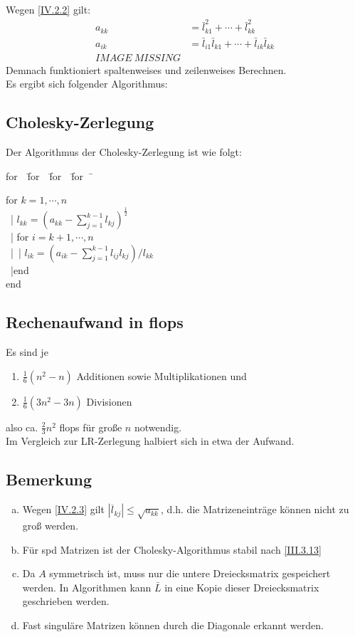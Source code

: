 \documentclass[ngerman,fontsize=11pt, paper=a4, parskip=half, titlepage=true, toc=bib]{scrbook}
\newenvironment{pseudocode}[1]{ %
		\begin{minipage}{#1}
			\begin{framed}
				\hspace*{1em}	
				\begin{minipage}{#1}
					\begin{tabbing}
						for~~\= for~~\= for~~\= for~~\= \kill
	}
	{ %
					\end{tabbing}
				\end{minipage}
				\hspace*{1em}
			\end{framed}
		\end{minipage}
	}
\begin{document}
		Wegen \eqref{IV.2.2} gilt: 
		\begin{align}
			a_{kk} &= \bar{l}_{k1}^{2} + \cdots +  \bar{l}_{kk}^2  \label{IV.2.3} \\
			a_{ik} &= \bar{l}_{i1} \bar{l}_{k1} + \cdots + \bar{l}_{ik} \bar{l}_{kk}  \label{IV.2.4} \\
			IMAGE~MISSING
		\end{align}
		Demnach funktioniert spaltenweises und zeilenweises Berechnen. \\
		
		Es ergibt sich folgender Algorithmus:
		
		
		\subsection{Cholesky-Zerlegung}
			Der Algorithmus der Cholesky-Zerlegung ist wie folgt:
			
				\begin{pseudocode}{0.55\linewidth}
						for  $k=1, \cdots , n$\\
									~|\> $l_{kk} = (a_{kk}-\sum_{j=1}^{k-1}l_{kj})^{\frac{1}{2}}$ \\
									~|\> for $i= k+1, \cdots , n$ \\
									~|\>~|\> $l_{ik} = ( a_{ik}- \sum_{j=1}^{k-1}l_{ij} l_{kj})/{l_{kk}}$  \\
									~|\>end\\
						end
					\end{pseudocode}
			
			
			
	\subsection{Rechenaufwand in flops}
	Es sind je 
		\begin{enumerate}
			\item[] $\frac{1}{6}(n^2-n) $ Additionen sowie Multiplikationen und 
			\item[]  $\frac{1}{6}(3n^2-3n) $ Divisionen 
		\end{enumerate}
		also ca. $\frac{2}{3} n^2$ flops für große $n$ notwendig. \\
		Im Vergleich zur LR-Zerlegung halbiert sich in etwa der Aufwand.
		
		\subsection{Bemerkung}
		\begin{enumerate}[a)]
			\item Wegen \eqref{IV.2.3} gilt $|\overline{l}_{kj}| \leq \sqrt{a_{kk}}$,
						d.h. die Matrizeneinträge können nicht zu groß werden.
			\item Für spd Matrizen ist der Cholesky-Algorithmus stabil nach \eqref{III.3.13}
			\item Da $A$ symmetrisch ist, muss nur die untere Dreiecksmatrix gespeichert werden.
				       In Algorithmen kann $\bar{L}$ in eine Kopie dieser Dreiecksmatrix geschrieben werden.
			\item Fast singuläre Matrizen können durch die Diagonale erkannt werden.
		\end{enumerate}
		
\end{document}
